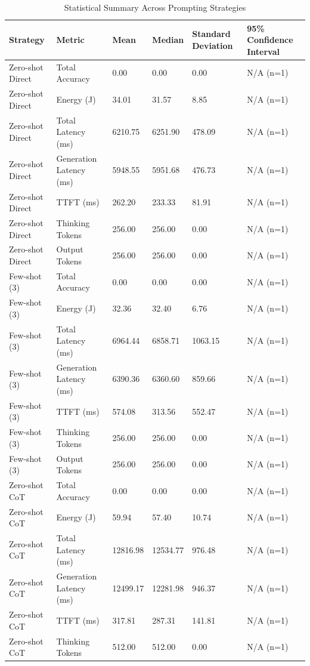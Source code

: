 \begin{table}
\caption{Statistical Summary Across Prompting Strategies}
\label{tab:statistical_summary}
\begin{tabular}{llllll}
\toprule
Strategy & Metric & Mean & Median & Standard Deviation & 95\% Confidence Interval \\
\midrule
Zero-shot Direct & Total Accuracy & 0.00 & 0.00 & 0.00 & N/A (n=1) \\
Zero-shot Direct & Energy (J) & 34.01 & 31.57 & 8.85 & N/A (n=1) \\
Zero-shot Direct & Total Latency (ms) & 6210.75 & 6251.90 & 478.09 & N/A (n=1) \\
Zero-shot Direct & Generation Latency (ms) & 5948.55 & 5951.68 & 476.73 & N/A (n=1) \\
Zero-shot Direct & TTFT (ms) & 262.20 & 233.33 & 81.91 & N/A (n=1) \\
Zero-shot Direct & Thinking Tokens & 256.00 & 256.00 & 0.00 & N/A (n=1) \\
Zero-shot Direct & Output Tokens & 256.00 & 256.00 & 0.00 & N/A (n=1) \\
Few-shot (3) & Total Accuracy & 0.00 & 0.00 & 0.00 & N/A (n=1) \\
Few-shot (3) & Energy (J) & 32.36 & 32.40 & 6.76 & N/A (n=1) \\
Few-shot (3) & Total Latency (ms) & 6964.44 & 6858.71 & 1063.15 & N/A (n=1) \\
Few-shot (3) & Generation Latency (ms) & 6390.36 & 6360.60 & 859.66 & N/A (n=1) \\
Few-shot (3) & TTFT (ms) & 574.08 & 313.56 & 552.47 & N/A (n=1) \\
Few-shot (3) & Thinking Tokens & 256.00 & 256.00 & 0.00 & N/A (n=1) \\
Few-shot (3) & Output Tokens & 256.00 & 256.00 & 0.00 & N/A (n=1) \\
Zero-shot CoT & Total Accuracy & 0.00 & 0.00 & 0.00 & N/A (n=1) \\
Zero-shot CoT & Energy (J) & 59.94 & 57.40 & 10.74 & N/A (n=1) \\
Zero-shot CoT & Total Latency (ms) & 12816.98 & 12534.77 & 976.48 & N/A (n=1) \\
Zero-shot CoT & Generation Latency (ms) & 12499.17 & 12281.98 & 946.37 & N/A (n=1) \\
Zero-shot CoT & TTFT (ms) & 317.81 & 287.31 & 141.81 & N/A (n=1) \\
Zero-shot CoT & Thinking Tokens & 512.00 & 512.00 & 0.00 & N/A (n=1) \\

\end{tabular}
\end{table}
